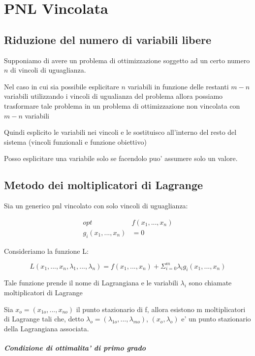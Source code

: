 \chapter{PNL Vincolata}

\section{Riduzione del numero di variabili libere}

Supponiamo di avere un problema di ottimizzazione soggetto ad un certo numero $n$ di vincoli di uguaglianza.

Nel caso in cui sia possibile esplicitare $n$ variabili in funzione delle restanti $m-n$ variabili utilizzando i vincoli di ugualianza del problema allora possiamo trasformare tale problema in un problema di ottimizzazione non vincolata con $m-n$ variabili

Quindi esplicito le variabili nei vincoli e le sostituisco all'interno del resto del sistema (vincoli funzionali e funzione obiettivo)

Posso esplicitare una variabile solo se facendolo puo' assumere solo un valore.

\section{Metodo dei moltiplicatori di Lagrange}

Sia un generico pnl vincolato con solo vincoli di uguaglianza:

\begin{align*}
    opt & f (x_1,...,x_n) \\
    g_i(x_1,...,x_n) &= 0
\end{align*}

Consideriamo la funzione L:

\[
    L(x_1,...,x_n,\lambda_1,...,\lambda_n) = f(x_1,...,x_n) + \Sigma ^ m _ {i=0} \lambda_i g_i(x_1,...,x_n)
\]

Tale funzione prende il nome di Lagrangiana e le variabili $\lambda_i$ sono chiamate moltiplicatori di Lagrange

Sia $x_o = (x_{1o},...,x_{no})$ il punto stazionario di f, allora esistono m moltiplicatori di Lagrange tali che, detto $\lambda_o = (\lambda_{1o},...,\lambda_{mo})$, $(x_o,\lambda_o)$ e' un punto stazionario della Lagrangiana associata.

\paragraph{Condizione di ottimalita' di primo grado}

